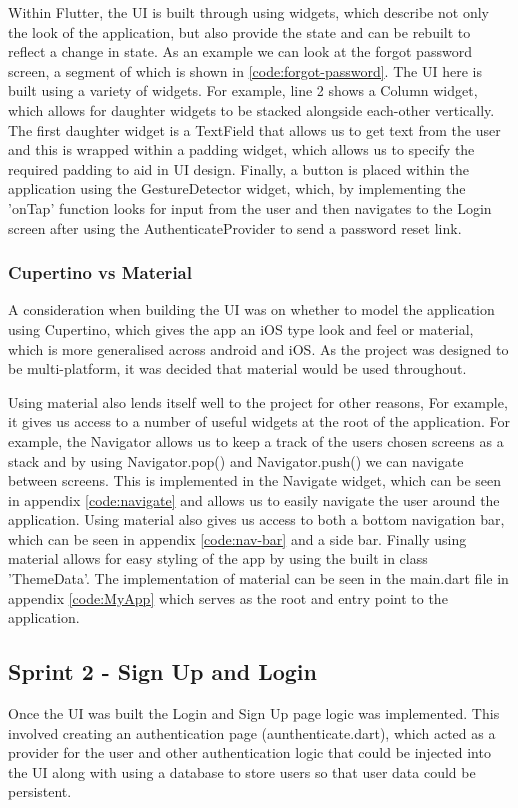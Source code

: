 \documentclass[12pt]{article}
\begin{document}
	Within Flutter, the UI is built through using widgets, which describe not only the look of the application, but also provide the state and can be rebuilt to reflect a change in state. As an example we can look at the forgot password screen, a segment of which is shown in \ref{code:forgot-password}. The UI here is built using a variety of widgets. For example, line 2 shows a Column widget, which allows for daughter widgets to be stacked alongside each-other vertically. The first daughter widget is a TextField that allows us to get text from the user and this is wrapped within a padding widget, which allows us to specify the required padding to aid in UI design. Finally, a button is placed within the application using the GestureDetector widget, which, by implementing the 'onTap' function looks for input from the user and then navigates to the Login screen after using the AuthenticateProvider to send a password reset link.  
	
	
	\subsubsection{Cupertino vs Material}
	A consideration when building the UI was on whether to model the application using Cupertino, which gives the app an iOS type look and feel or material, which is more generalised across android and iOS. As the project was designed to be multi-platform, it was decided that material would be used throughout. 
	
	Using material also lends itself well to the project for other reasons, For example, it gives us access to a number of useful widgets at the root of the application. For example, the Navigator allows us to keep a track of the users chosen screens as a stack and by using Navigator.pop() and Navigator.push() we can navigate between screens. This is implemented in the Navigate widget, which can be seen in appendix \ref{code:navigate} and allows us to easily navigate the user around the application. Using material also gives us access to both a bottom navigation bar, which can be seen in appendix \ref{code:nav-bar} and a side bar. Finally using material allows for easy styling of the app by using the built in class 'ThemeData'. The implementation of material can be seen in the main.dart file in appendix \ref{code:MyApp} which serves as the root and entry point to the application.
	
	
	
	\subsection{Sprint 2 - Sign Up and Login}
	Once the UI was built the Login and Sign Up page logic was implemented. This involved creating an authentication page (aunthenticate.dart), which acted as a provider for the user and other authentication logic that could be injected into the UI along with using a database to store users so that user data could be persistent.
	
\end{document}
